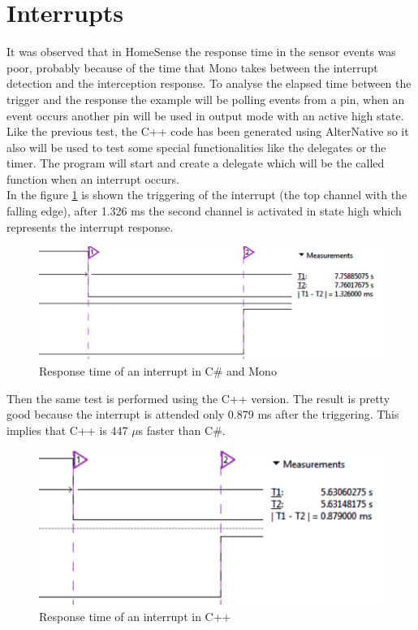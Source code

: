 \section{Interrupts}\label{S:Performance-Interruptions}
It was observed that in HomeSense the response time in the sensor events was poor, probably because of the time that Mono takes between the interrupt detection and the interception response. To analyse the elapsed time between the trigger and the response the example will be polling events from a pin, when an event occurs another pin  will be used in output mode with an active high state.
\\
Like the previous test, the C++ code has been generated using AlterNative so it also will be used to test some special functionalities like the delegates or the timer. The program will start and create a delegate which will be the called function when an interrupt occurs.
\\
In the figure \ref{fig:interrupt-csharp} is shown the triggering of the interrupt (the top channel with the falling edge), after 1.326 ms the second channel is activated in state high which represents the interrupt response.
\begin{figure}[H]\begin{center}
 \centering
  \captionsetup{justification=centering}
  \includegraphics[scale=0.65]{pictures/performance-tests/Interruptions/csharp}
  \caption{Response time of an interrupt in C\# and Mono\label{fig:interrupt-csharp}}
\end{center}\end{figure}
Then the same test is performed using the C++ version. The result is pretty good because the interrupt is attended only 0.879 ms after the triggering. This implies that C++ is 447 $\mu$s faster than C\#.
\begin{figure}[H]\begin{center}
 \centering
  \captionsetup{justification=centering}
  \includegraphics[scale=0.65]{pictures/performance-tests/Interruptions/cxx}
  \caption{Response time of an interrupt in C++\label{fig:interrupt-cxx}}
\end{center}\end{figure}
